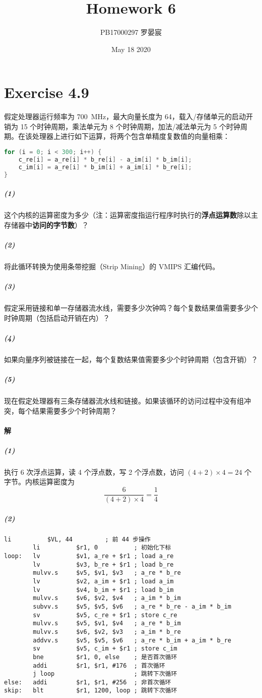 \documentclass{article}
\title{Homework 6}
\author{PB17000297 罗晏宸}
\date{May 18 2020}
\begin{document}
\maketitle

\section{Exercise 4.9}
假定处理器运行频率为 \SI{700}{\mega\hertz}，最大向量长度为 64，载入/存储单元的启动开销为 15 个时钟周期，乘法单元为 8 个时钟周期，加法/减法单元为 5 个时钟周期。在该处理器上进行如下运算，将两个包含单精度复数值的向量相乘：
\begin{lstlisting}[breaklines = false, language=C++]
for (i = 0; i < 300; i++) {
    c_re[i] = a_re[i] * b_re[i] - a_im[i] * b_im[i];
    c_im[i] = a_re[i] * b_im[i] + a_im[i] * b_re[i];
}
\end{lstlisting}
\subparagraph{(1)} 这个内核的运算密度为多少（注：运算密度指运行程序时执行的\textbf{浮点运算数}除以主存储器中\textbf{访问的字节数}）？
\subparagraph{(2)} 将此循环转换为使用条带挖掘（Strip Mining）的 VMIPS 汇编代码。
\subparagraph{(3)} 假定采用链接和单一存储器流水线，需要多少次钟鸣？每个复数结果值需要多少个时钟周期（包括启动开销在内）？
\subparagraph{(4)} 如果向量序列被链接在一起，每个复数结果值需要多少个时钟周期（包含开销）？
\subparagraph{(5)} 现在假定处理器有三条存储器流水线和链接。如果该循环的访问过程中没有组冲突，每个结果需要多少个时钟周期？

\paragraph{解}
\subparagraph{(1)} 执行 6 次浮点运算，读 4 个浮点数，写 2 个浮点数，访问 $(4 + 2) \times 4 = 24$ 个字节。内核运算密度为
$$
    \frac{6}{(4 + 2) \times 4} = \frac{1}{4}
$$
\subparagraph{(2)}
\begin{lstlisting}[language={[x86masm]Assembler}, breakindent = 41ex]
        li          $VL, 44         ; 前 44 步操作
        li          $r1, 0          ; 初始化下标
loop:   lv          $v1, a_re + $r1 ; load a_re
        lv          $v3, b_re + $r1 ; load b_re
        mulvv.s     $v5, $v1, $v3   ; a_re * b_re
        lv          $v2, a_im + $r1 ; load a_im
        lv          $v4, b_im + $r1 ; load b_im
        mulvv.s     $v6, $v2, $v4   ; a_im * b_im
        subvv.s     $v5, $v5, $v6   ; a_re * b_re - a_im * b_im
        sv          $v5, c_re + $r1 ; store c_re
        mulvv.s     $v5, $v1, $v4   ; a_re * b_im
        mulvv.s     $v6, $v2, $v3   ; a_im * b_re
        addvv.s     $v5, $v5, $v6   ; a_re * b_im + a_im * b_re
        sv          $v5, c_im + $r1 ; store c_im
        bne         $r1, 0, else    ; 是否首次循环
        addi        $r1, $r1, #176  ; 首次循环
        j loop                      ; 跳转下次循环
else:   addi        $r1, $r1, #256  ; 非首次循环
skip:   blt         $r1, 1200, loop ; 跳转下次循环
\end{lstlisting}
\end{document}

